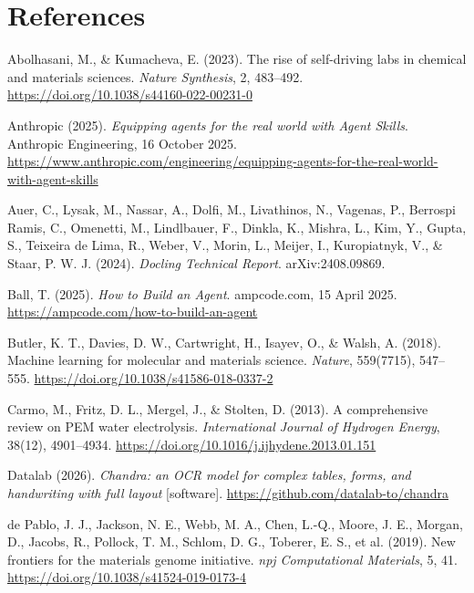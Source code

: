 \documentclass{template}
\begin{document}

\section*{References}

\begingroup
\setlength{\parindent}{0pt}
\setlength{\parskip}{0.5em}

Abolhasani, M., \& Kumacheva, E. (2023). The rise of self-driving labs in chemical and materials sciences. \textit{Nature Synthesis}, 2, 483--492. \url{https://doi.org/10.1038/s44160-022-00231-0}

Anthropic (2025). \textit{Equipping agents for the real world with Agent Skills}. Anthropic Engineering, 16 October 2025. \url{https://www.anthropic.com/engineering/equipping-agents-for-the-real-world-with-agent-skills}

Auer, C., Lysak, M., Nassar, A., Dolfi, M., Livathinos, N., Vagenas, P., Berrospi Ramis, C., Omenetti, M., Lindlbauer, F., Dinkla, K., Mishra, L., Kim, Y., Gupta, S., Teixeira de Lima, R., Weber, V., Morin, L., Meijer, I., Kuropiatnyk, V., \& Staar, P. W. J. (2024). \textit{Docling Technical Report}. arXiv:2408.09869.

Ball, T. (2025). \textit{How to Build an Agent}. ampcode.com, 15 April 2025. \url{https://ampcode.com/how-to-build-an-agent}

Butler, K. T., Davies, D. W., Cartwright, H., Isayev, O., \& Walsh, A. (2018). Machine learning for molecular and materials science. \textit{Nature}, 559(7715), 547--555. \url{https://doi.org/10.1038/s41586-018-0337-2}

Carmo, M., Fritz, D. L., Mergel, J., \& Stolten, D. (2013). A comprehensive review on PEM water electrolysis. \textit{International Journal of Hydrogen Energy}, 38(12), 4901--4934. \url{https://doi.org/10.1016/j.ijhydene.2013.01.151}

Datalab (2026). \textit{Chandra: an OCR model for complex tables, forms, and handwriting with full layout} [software]. \url{https://github.com/datalab-to/chandra}

de Pablo, J. J., Jackson, N. E., Webb, M. A., Chen, L.-Q., Moore, J. E., Morgan, D., Jacobs, R., Pollock, T. M., Schlom, D. G., Toberer, E. S., et al. (2019). New frontiers for the materials genome initiative. \textit{npj Computational Materials}, 5, 41. \url{https://doi.org/10.1038/s41524-019-0173-4}
\end{document}
